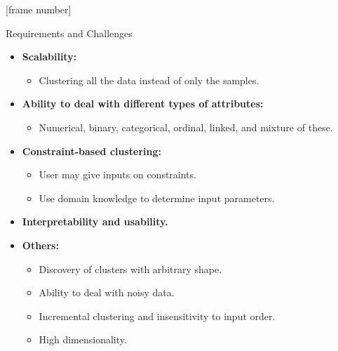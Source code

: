 \documentclass[aspectratio=169,t,xcolor=dvipsnames]{beamer}
\begin{document}
  {
    [frame number]
    \begin{frame}{Requirements and Challenges}
        \begin{itemize}
          \item \textbf{Scalability:}
          \begin{itemize}
            \item Clustering all the data instead of only the samples.
          \end{itemize}
          \item \textbf{Ability to deal with different types of attributes:}
          \begin{itemize}
            \item Numerical, binary, categorical, ordinal, linked, and mixture of these.
          \end{itemize}
          \item \textbf{Constraint-based clustering:}
          \begin{itemize}
            \item User may give inputs on constraints.
            \item Use domain knowledge to determine input parameters.
          \end{itemize}
          \item \textbf{Interpretability and usability.}
          \item \textbf{Others:}
          \begin{itemize}
            \item Discovery of clusters with arbitrary shape.
            \item Ability to deal with noisy data.
            \item Incremental clustering and insensitivity to input order.
            \item High dimensionality.
          \end{itemize}
        \end{itemize}
    \end{frame}
  }
\end{document}
